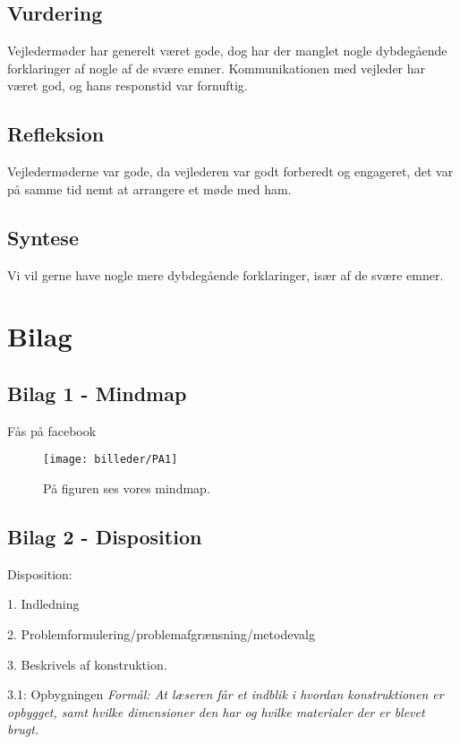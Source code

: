 \subsection{Vurdering}
Vejledermøder har generelt været gode, dog har der manglet nogle dybdegående forklaringer af nogle af de svære emner. Kommunikationen med vejleder har været god, og hans responstid var fornuftig.

\subsection{Refleksion}
Vejledermøderne var gode, da vejlederen var godt forberedt og engageret, det var på samme tid nemt at arrangere et møde med ham.

\subsection{Syntese}
Vi vil gerne have nogle mere dybdegående forklaringer, især af de svære emner.







\section{Bilag}

\subsection{Bilag 1 - Mindmap} \label{sec:Bilag1}
Fås på facebook

\begin{figure}[H] 
\centering
\texttt{[image: billeder/PA1]}
\caption{På figuren ses vores mindmap.}
\label{fig:Sne1}
\end{figure}


\subsection{Bilag 2 - Disposition} \label{sec:Bilag2}

Disposition:

1. Indledning


2. Problemformulering/problemafgrænsning/metodevalg


3. Beskrivels af konstruktion.

3.1: Opbygningen \textit{Formål: At læseren får et indblik i hvordan konstruktionen er opbygget, samt hvilke dimensioner den har og hvilke materialer der er blevet brugt.}

